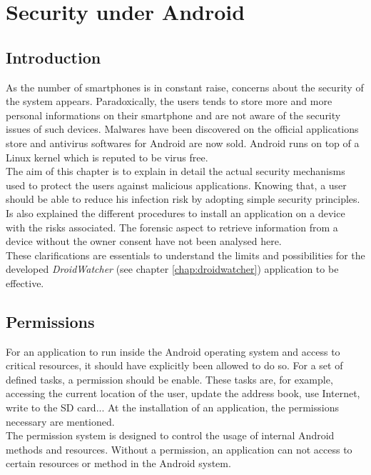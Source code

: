 \chapter{Security under Android}
\label{chap:and-secu}

\section*{Introduction}
As the number of smartphones is in constant raise, concerns about the security of the system appears.
Paradoxically, the users tends to store more and more personal informations on their smartphone and are not aware of the security issues of such devices.
Malwares have been discovered on the official applications store and antivirus softwares for Android are now sold.
Android runs on top of a Linux kernel which is reputed to be virus free.\\

The aim of this chapter is to explain in detail the actual security mechanisms used to protect the users against malicious applications.
Knowing that, a user should be able to reduce his infection risk by adopting simple security principles.
Is also explained the different procedures to install an application on a device with the risks associated.
The forensic aspect to retrieve information from a device without the owner consent have not been analysed here.\\

These clarifications are essentials to understand the limits and possibilities for the developed \emph{DroidWatcher} (see chapter \ref{chap:droidwatcher}) application to be effective.

\section{Permissions}
For an application to run inside the Android operating system and access to critical resources, it should have explicitly been allowed to do so.
For a set of defined tasks, a permission should be enable.
These tasks are, for example, accessing the current location of the user, update the address book, use Internet, write to the SD card...
At the installation of an application, the permissions necessary are mentioned.\\

The permission system is designed to control the usage of internal Android methods and resources.
Without a permission, an application can not access to certain resources or method in the Android system.


